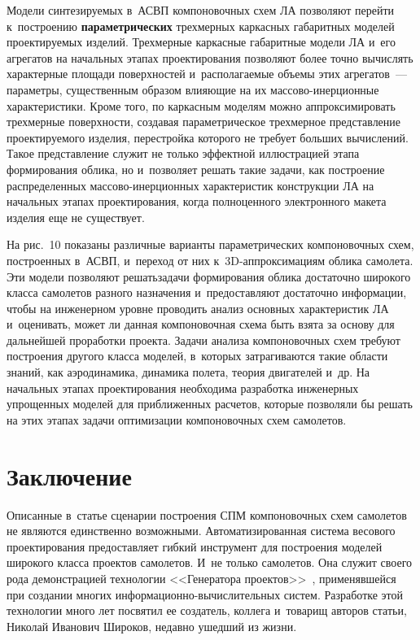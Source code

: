 \begin{multicols}{2}
  Модели синтезируемых в~\mbox{АСВП} компоновочных схем ЛА позволяют 
перейти к~построению \textbf{па\-ра\-мет\-ри\-че\-ских} трехмерных каркасных 
габаритных моделей про\-ек\-ти\-ру\-емых изделий. Трехмерные каркасные 
габаритные модели ЛА и~его агрегатов на начальных этапах проектирования 
поз\-во\-ля\-ют более точ\-но вы\-чис\-лять характерные площади поверхностей 
и~располагаемые объемы этих агрегатов~--- па\-ра\-мет\-ры, существенным 
образом влияющие на их мас\-со\-во-инер\-ци\-он\-ные характеристики. Кроме\linebreak 
того, по каркасным моделям можно аппроксимировать трехмерные 
поверхности, создавая па\-ра\-мет\-ри\-че\-ское трехмерное пред\-став\-ле\-ние 
про\-ек\-ти\-ру\-емо\-го изделия, перестройка которого не требует больших 
вы\-чис\-ле\-ний. Такое пред\-став\-ле\-ние служит не только эффектной иллюстрацией 
этапа формирования облика, но и~поз\-во\-ля\-ет решать такие задачи, как 
по\-стро\-ение распределенных мас\-со\-во-инер\-ци\-он\-ных характеристик конструкции 
ЛА на начальных этапах проектирования, когда полноценного электронного 
макета изделия еще не существует.
  


  На рис.~10 показаны различные варианты параметрических компоновочных 
схем, по\-стро\-ен\-ных в~\mbox{АСВП}, и~переход от них к~3D-ап\-прок\-си\-ма\-ци\-ям 
облика самолета. Эти модели позволяют решать\linebreak задачи формирования облика 
достаточно широкого %
класса самолетов разного назначения и~предостав\-ля\-ют 
достаточно информации, чтобы на инженерном уровне проводить анализ 
основных \mbox{характеристик} ЛА и~оценивать, может ли данная компоновочная 
схема быть взята за основу для дальнейшей проработки проекта. Задачи 
анализа компоновочных схем требуют построения другого класса моделей, 
в~которых затрагиваются такие области знаний, как аэродинамика, динамика 
полета, тео\-рия двигателей и~др. На начальных этапах проектирования 
необходима разработка инженерных упрощенных моделей для при\-бли\-жен\-ных 
расчетов, которые поз\-во\-ля\-ли бы решать на этих этапах задачи оптимизации 
компоновочных схем са\-мо\-летов.
  
\section{Заключение}

  Описанные в~статье сценарии по\-стро\-ения 
СПМ компоновочных схем самолетов не являются единственно 
воз\-мож\-ны\-ми. Автоматизированная сис\-те\-ма весового проектирования предоставляет гиб\-кий инструмент для по\-стро\-ения моделей 
широкого класса проектов самолетов. И~не только \mbox{самолетов}. Она служит 
своего рода демонстрацией технологии <<Генератора проектов>>~\cite{5-fl}, 
применявшейся при создании многих ин\-фор\-ма\-ци\-он\-но-вы\-чис\-ли\-тель\-ных сис\-тем. 
Разработке этой технологии много лет посвятил ее создатель, коллега 
и~товарищ авторов \mbox{статьи}, Николай Иванович Широков, недавно ушедший из 
жизни.
  

\end{multicols}
